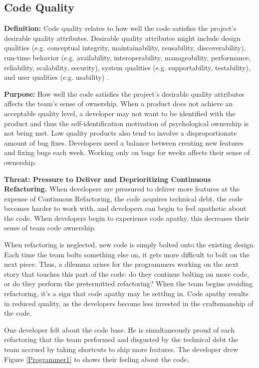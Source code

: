 \subsection{Code Quality}
\textbf{Definition:} Code quality relates to how well the code satisfies the project's desirable quality attributes. Desirable quality attributes might include design qualities (e.g. conceptual integrity, maintainability, reusability, discoverability), run-time behavior (e.g. availability, interoperability, manageability, performance, reliability, scalability, security), system qualities (e.g. supportability, testability), and user qualities (e.g. usability) \cite{Meier2009}. 

\textbf{Purpose:} How well the code satisfies the project's desirable quality attributes affects the team's sense of ownership. When a product does not achieve an acceptable quality level, a developer may not want to be identified with the product and thus the self-identification motivation of psychological ownership is not being met. Low quality products also tend to involve a disproportionate amount of bug fixes. Developers need a balance between creating new features and fixing bugs each week. Working only on bugs for weeks affects their sense of ownership.    

\textbf{Threat: Pressure to Deliver and Deprioritizing Continuous Refactoring.} When developers are pressured to deliver more features at the expense of Continuous Refactoring, the code acquires technical debt, the code becomes harder to work with, and developers can begin to feel apathetic about the code. When developers begin to experience code apathy, this decreases their sense of team code ownership. 

When refactoring is neglected, new code is simply bolted onto the existing design. Each time the team bolts something else on, it gets more difficult to bolt on the next piece. Thus, a dilemma arises for the programmers working on the next story that touches this part of the code: do they continue bolting on more code, or do they perform the pretermitted refactoring? When the team begins avoiding refactoring, it's a sign that code apathy may be settling in. Code apathy results in reduced quality, as the developers become less invested in the craftsmanship of the code.

One developer felt  about the code base. He is simultaneously proud of each refactoring that the team performed and disgusted by the technical debt the team accrued by taking shortcuts to ship more features. The developer drew Figure \ref{Programmer1} to shows their feeling about the code, 

